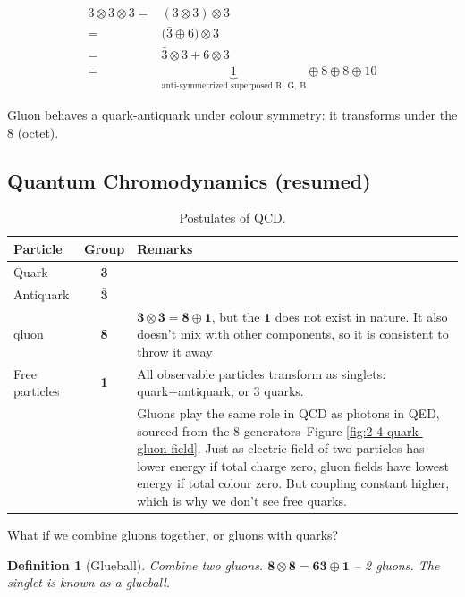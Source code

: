 \documentclass[]{article}
\newtheorem{defn}[thm]{Definition}
\begin{document}
\begin{align*}
3 \otimes 3 \otimes 3 =& (3 \otimes 3) \otimes 3\\
=& \big(\bar{3} \oplus 6 \big) \otimes 3\\
=& \bar{3}   \otimes 3 + 6 \otimes 3\\
=& \underbrace{1}_\text{anti-symmetrized superposed R, G, B} \oplus 8 \oplus 8 \oplus 10
\end{align*}

Gluon behaves a quark-antiquark under colour symmetry: it transforms under the 8 (octet).

\subsection{Quantum Chromodynamics (resumed)}

\begin{table}[H]
	\begin{center}
		\caption{Postulates of QCD.}\label{table:postulates:QCD}
		\begin{tabular}{|l|c|p{8cm}|} \hline
			Particle&Group&Remarks \\ \hline
			Quark&{\bfseries 3}& \\ \hline
			Antiquark&$\bm{\bar{3}}$& \\ \hline
			qluon&{\bfseries 8}&$\bm{3}\otimes\bm{3}=\bm{8}\oplus\bm{1}$, but the $\bm{1}$ does not exist in nature. It also doesn't mix with other components, so it is consistent to throw it away \\ \hline
			Free particles&{\bfseries 1}&All observable particles transform as singlets: quark+antiquark, or 3 quarks.\\ \hline
			&&Gluons play the same role in QCD as photons in QED, sourced from the 8 generators--Figure \ref{fig:2-4-quark-gluon-field}. Just as electric field of two particles has lower energy if total charge zero, gluon fields have lowest energy if total colour zero. But coupling constant higher, which is why we don't see free quarks.\\ \hline
		\end{tabular}
	\end{center}
\end{table}

What if we combine gluons together, or gluons with quarks?

\begin{defn}[Glueball]
	Combine two gluons. $\bm{8} \otimes \bm{8} = \bm{63} \oplus \bm{1}$ -- 2 gluons. The singlet is known as a glueball.
\end{defn}
\end{document}
